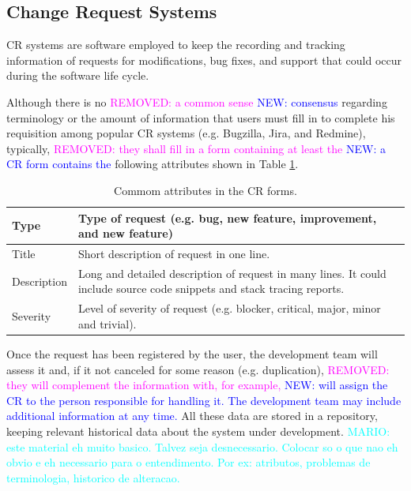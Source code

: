 \documentclass[10pt, conference]{IEEEtran}
\newcommand{\mario}[1]{\noindent\textcolor{cyan}{MARIO: {#1}}}
\newcommand{\rem}[1]{\noindent\textcolor{magenta}{REMOVED: {#1}}}
\newcommand{\new}[1]{\noindent\textcolor{blue}{NEW: {#1}}}
\newcommand{\mario}[1]{}
\newcommand{\rem}[1]{}
\newcommand{\new}[1]{#1}
\begin{document}
\subsection{Change Request Systems}		\label{subsec:crs}
CR systems\cite{Pressman2009} are software employed to keep the recording and tracking information of requests for modifications, bug fixes, and support that could occur during the software life cycle. 

Although there is no \rem{a common sense} \new{consensus} regarding terminology or the amount of information that users must fill in to complete his requisition among popular CR systems (e.g. Bugzilla, Jira, and Redmine)\cite{Tian2012}, typically, \rem{they shall fill in a form containing at least the} \new{a CR form contains the} following attributes shown in Table \ref{tab:commom_attributes_cr_form}. 

\begin{table}[!ht]
	\renewcommand{\arraystretch}{1.3}
	\caption{Commom attributes in the CR forms.}
	\label{tab:commom_attributes_cr_form}
	\centering
	\begin{tabular}{|l|p{6cm}|}
		\hline
		Type & Type of request (e.g. bug, new feature, improvement, and new feature)\\
		\hline
		Title & Short description of request in one line.\\
		\hline
		Description & Long and detailed description of request in many lines. It could include source code snippets and stack tracing reports.\\
		\hline
		Severity & Level of severity of request (e.g. blocker, critical, major, minor and trivial).\\
		\hline 
	\end{tabular}
\end{table}

Once the request has been registered by the user, the development team will assess it and, if it not canceled for some reason (e.g. duplication), \rem{they will complement the information with, for example, } \new{will assign the CR to the person responsible for handling it. The development team may include additional information at any time.} All these data are stored in a repository, keeping relevant historical data about the system under development. \mario{este material eh muito basico. Talvez seja desnecessario. Colocar so o que nao eh obvio e eh necessario para o entendimento. Por ex: atributos, problemas de terminologia, historico de alteracao.}
\end{document}
